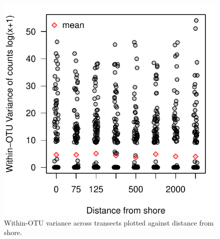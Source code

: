 \documentclass[11pt,letterpaper]{article} %
\begin{document}
\begin{figure}[h!] %
  \centering
    \includegraphics[width=1\textwidth]{../../Figures/variance_from_shore.pdf}
    \caption{Within-OTU variance across transects plotted against distance from shore.}
  \label{variance_from_shore} %
\end{figure}
\end{document}
